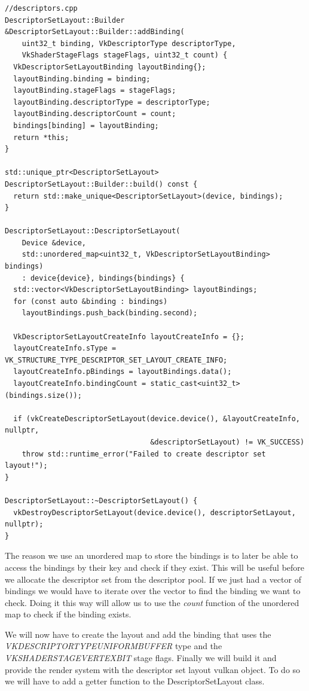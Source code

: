 \documentclass[12pt]{report} \usepackage{preamble}
\begin{document}
\begin{lstlisting}[Language=C++]
//descriptors.cpp
DescriptorSetLayout::Builder &DescriptorSetLayout::Builder::addBinding(
    uint32_t binding, VkDescriptorType descriptorType,
    VkShaderStageFlags stageFlags, uint32_t count) {
  VkDescriptorSetLayoutBinding layoutBinding{};
  layoutBinding.binding = binding;
  layoutBinding.stageFlags = stageFlags;
  layoutBinding.descriptorType = descriptorType;
  layoutBinding.descriptorCount = count;
  bindings[binding] = layoutBinding;
  return *this;
}

std::unique_ptr<DescriptorSetLayout>
DescriptorSetLayout::Builder::build() const {
  return std::make_unique<DescriptorSetLayout>(device, bindings);
}

DescriptorSetLayout::DescriptorSetLayout(
    Device &device,
    std::unordered_map<uint32_t, VkDescriptorSetLayoutBinding> bindings)
    : device{device}, bindings{bindings} {
  std::vector<VkDescriptorSetLayoutBinding> layoutBindings;
  for (const auto &binding : bindings)
    layoutBindings.push_back(binding.second);

  VkDescriptorSetLayoutCreateInfo layoutCreateInfo = {};
  layoutCreateInfo.sType = VK_STRUCTURE_TYPE_DESCRIPTOR_SET_LAYOUT_CREATE_INFO;
  layoutCreateInfo.pBindings = layoutBindings.data();
  layoutCreateInfo.bindingCount = static_cast<uint32_t>(bindings.size());

  if (vkCreateDescriptorSetLayout(device.device(), &layoutCreateInfo, nullptr,
                                  &descriptorSetLayout) != VK_SUCCESS)
    throw std::runtime_error("Failed to create descriptor set layout!");
}

DescriptorSetLayout::~DescriptorSetLayout() {
  vkDestroyDescriptorSetLayout(device.device(), descriptorSetLayout, nullptr);
}
\end{lstlisting}

The reason we use an unordered map to store the bindings is to later be able to access the bindings by their key and check if they exist.
This will be useful before we allocate the descriptor set from the descriptor pool. If we just had a vector of bindings we would have to iterate over the vector to find the binding we want to check.
Doing it this way will allow us to use the \textit{count} function of the unordered map to check if the binding exists.

We will now have to create the layout and add the binding that uses the \textit{VK\textunderscore DESCRIPTOR\textunderscore TYPE\textunderscore UNIFORM\textunderscore BUFFER} type
and the \textit{VK\textunderscore SHADER\textunderscore STAGE\textunderscore VERTEX\textunderscore BIT} stage flags.
Finally we will build it and provide the render system with the descriptor set layout vulkan object. To do so we will have to add a getter function to the DescriptorSetLayout class.
\end{document}
